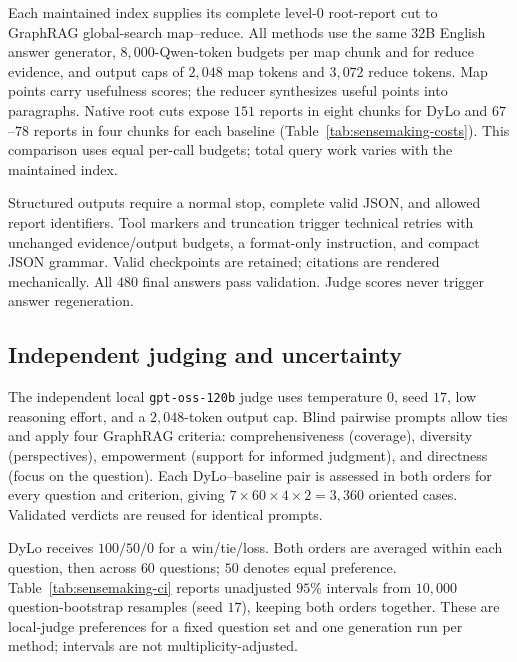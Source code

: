 Each maintained index supplies its complete level-$0$ root-report cut to
GraphRAG global-search map--reduce. All methods use the same 32B English
answer generator, $8{,}000$-Qwen-token budgets per map chunk and for reduce
evidence, and output caps of $2{,}048$ map tokens and $3{,}072$ reduce tokens.
Map points carry usefulness scores; the reducer synthesizes useful points
into paragraphs. Native root cuts expose $151$ reports in eight chunks for
DyLo and $67$--$78$ reports in four chunks for each baseline
(Table~\ref{tab:sensemaking-costs}). This comparison uses equal per-call
budgets; total query work varies with the maintained index.

Structured outputs require a normal stop, complete valid JSON, and allowed
report identifiers. Tool markers and truncation trigger technical retries
with unchanged evidence/output budgets, a format-only instruction, and
compact JSON grammar. Valid checkpoints are retained; citations are rendered
mechanically. All $480$ final answers pass validation. Judge scores never
trigger answer regeneration.

\subsection{Independent judging and uncertainty}\label{app:case-judge}

The independent local \texttt{gpt-oss-120b} judge uses temperature $0$,
seed $17$, low reasoning effort, and a $2{,}048$-token output cap.
Blind pairwise prompts allow ties and apply four GraphRAG criteria:
comprehensiveness (coverage), diversity (perspectives), empowerment (support
for informed judgment), and directness (focus on the question).
Each DyLo--baseline pair is assessed in both orders for every question and
criterion, giving $7\times60\times4\times2=3{,}360$ oriented cases.
Validated verdicts are reused for identical prompts.

DyLo receives $100/50/0$ for a win/tie/loss. Both orders are averaged within
each question, then across $60$ questions; $50$ denotes equal preference.
Table~\ref{tab:sensemaking-ci} reports unadjusted $95\%$ intervals from
$10{,}000$ question-bootstrap resamples (seed $17$), keeping both orders
together. These are local-judge preferences for a fixed question set and
one generation run per method; intervals are not multiplicity-adjusted.

